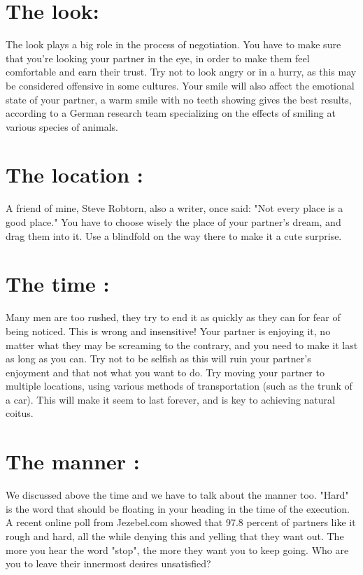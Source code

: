 \section*{The look:}
The look plays a big role in the process of negotiation. You have to make sure that you're looking your partner in the eye, in order to make them feel comfortable and earn their trust. Try not to look angry or in a hurry, as this may be considered offensive in some cultures.
Your smile will also affect the emotional state of your partner, a warm smile with no teeth showing gives the best results, according to a German research team specializing on the effects of smiling at various species of animals.

\section*{The location :}
A friend of mine, Steve Robtorn, also a writer, once said: "Not every place is a good place." You have to choose wisely the place of your partner’s dream, and drag them into it. Use a blindfold on the way there to make it a cute surprise.

\section*{The time :}
Many men are too rushed, they try to end it as quickly as they can for fear of being noticed. This is wrong and insensitive! Your partner is enjoying it, no matter what they may be screaming to the contrary, and you need to make it last as long as you can. Try not to be selfish as this will ruin your partner’s enjoyment and that not what you want to do. Try moving your partner to multiple locations, using various methods of transportation (such as the trunk of a car). This will make it seem to last forever, and is key to achieving natural coitus.

\section*{The manner :}
We discussed above the time and we have to talk about the manner too. "Hard" is the word that should be floating in your heading in the time of the execution. A recent online poll from Jezebel.com showed that 97.8 percent of partners like it rough and hard, all the while denying this and yelling that they want out. The more you hear the word "stop", the more they want you to keep going. Who are you to leave their innermost desires unsatisfied?
